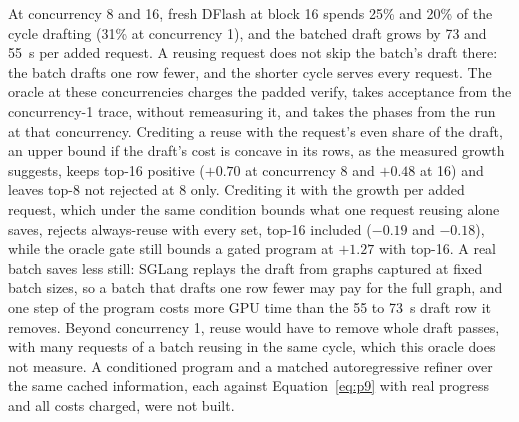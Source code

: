 At concurrency 8 and 16, fresh DFlash at block 16 spends 25\% and 20\% of the cycle drafting (31\% at concurrency 1), and the batched draft grows by 73 and 55~\textmu s per added request. A reusing request does not skip the batch's draft there: the batch drafts one row fewer, and the shorter cycle serves every request. The oracle at these concurrencies charges the padded verify, takes acceptance from the concurrency-1 trace, without remeasuring it, and takes the phases from the run at that concurrency. Crediting a reuse with the request's even share of the draft, an upper bound if the draft's cost is concave in its rows, as the measured growth suggests, keeps top-16 positive ($+0.70$ at concurrency 8 and $+0.48$ at 16) and leaves top-8 not rejected at 8 only. Crediting it with the growth per added request, which under the same condition bounds what one request reusing alone saves, rejects always-reuse with every set, top-16 included ($-0.19$ and $-0.18$), while the oracle gate still bounds a gated program at $+1.27$ with top-16. A real batch saves less still: SGLang replays the draft from graphs captured at fixed batch sizes, so a batch that drafts one row fewer may pay for the full graph, and one step of the program costs more GPU time than the 55 to 73~\textmu s draft row it removes. Beyond concurrency 1, reuse would have to remove whole draft passes, with many requests of a batch reusing in the same cycle, which this oracle does not measure. A conditioned program and a matched autoregressive refiner over the same cached information, each against Equation~\eqref{eq:p9} with real progress and all costs charged, were not built.

